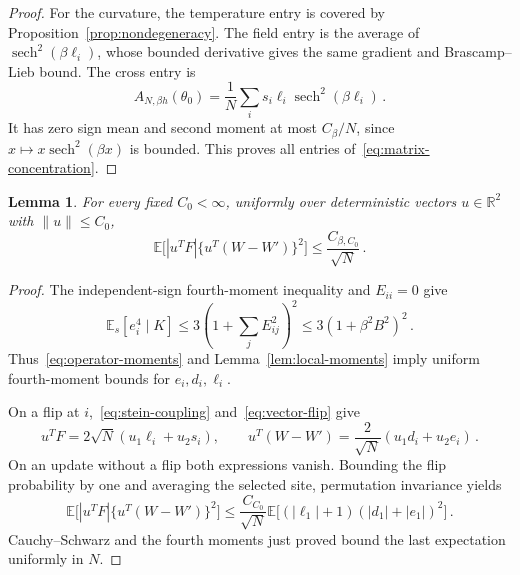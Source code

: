 \documentclass[11pt]{amsart}
\numberwithin{equation}{section}
\newtheorem{lemma}[theorem]{Lemma}
\theoremstyle{remark}
\newcommand{\E}{\mathbb E}
\newcommand{\R}{\mathbb R}
\newcommand{\sech}{\operatorname{sech}}
\begin{document}
\begin{proof}
For the curvature, the temperature entry is covered by Proposition~\ref{prop:nondegeneracy}. The field entry is the average of $\sech^2(\beta\ell_i)$, whose bounded derivative gives the same gradient and Brascamp--Lieb bound. The cross entry is
\begin{equation*}
 A_{N,\beta h}(\theta_0)
 =\frac1N\sum_i s_i\ell_i\sech^2(\beta\ell_i)\,.
\end{equation*}
It has zero sign mean and second moment at most $C_\beta/N$, since $x\mapsto x\sech^2(\beta x)$ is bounded. This proves all entries of~\eqref{eq:matrix-concentration}.
\end{proof}

\begin{lemma}\label{lem:small-jumps}
For every fixed $C_0<\infty$, uniformly over deterministic vectors $u\in\R^2$ with $\|u\|\le C_0$,
\begin{equation}
 \E\bigl[|u^TF|\{u^T(W-W')\}^2\bigr]
 \le\frac{C_{\beta,C_0}}{\sqrt N}\,.
 \label{eq:small-jumps}
\end{equation}
\end{lemma}
\begin{proof}
The independent-sign fourth-moment inequality and $E_{ii}=0$ give
\begin{equation*}
 \E_s[e_i^4\mid K]
 \le3\left(1+\sum_jE_{ij}^2\right)^2
 \le3(1+\beta^2B^2)^2\,.
\end{equation*}
Thus~\eqref{eq:operator-moments} and Lemma~\ref{lem:local-moments} imply uniform fourth-moment bounds for $e_i,d_i,\ell_i$.

On a flip at $i$,~\eqref{eq:stein-coupling} and~\eqref{eq:vector-flip} give
\begin{equation*}
 u^TF=2\sqrt N(u_1\ell_i+u_2s_i),\qquad
 u^T(W-W')=\frac2{\sqrt N}(u_1d_i+u_2e_i)\,.
\end{equation*}
On an update without a flip both expressions vanish. Bounding the flip probability by one and averaging the selected site, permutation invariance yields
\begin{equation*}
 \E\bigl[|u^TF|\{u^T(W-W')\}^2\bigr]
 \le\frac{C_{C_0}}{\sqrt N}
 \E\bigl[(|\ell_1|+1)(|d_1|+|e_1|)^2\bigr]\,.
\end{equation*}
Cauchy--Schwarz and the fourth moments just proved bound the last expectation uniformly in $N$.
\end{proof}
\end{document}
